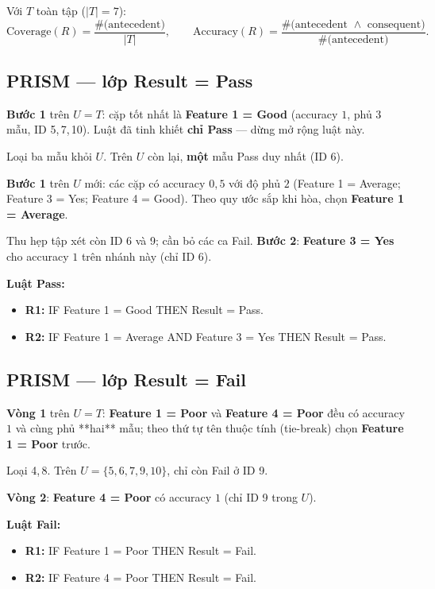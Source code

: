 Với \(T\) toàn tập (\(|T|=7\)):
\[
\text{Coverage}(R)=\frac{\#\text{(antecedent)}}{|T|},\qquad
\text{Accuracy}(R)=\frac{\#\text{(antecedent }\land\text{ consequent)}}{\#\text{(antecedent)}}.
\]

\subsection*{PRISM --- lớp Result = Pass}

\textbf{Bước 1} trên \(U=T\): cặp tốt nhất là \textbf{Feature 1 = Good} (accuracy \(1\), phủ \(3\) mẫu, ID 5,\,7,\,10). Luật đã tinh khiết \textbf{chỉ Pass} --- dừng mở rộng luật này.

Loại ba mẫu khỏi \(U\). Trên \(U\) còn lại, \textbf{một} mẫu Pass duy nhất (ID 6).

\textbf{Bước 1} trên \(U\) mới: các cặp có accuracy \(0{,}5\) với độ phủ \(2\) (Feature 1 = Average; Feature 3 = Yes; Feature 4 = Good). Theo quy ước sắp khi hòa, chọn \textbf{Feature 1 = Average}.

Thu hẹp tập xét còn ID 6 và 9; cần bỏ các ca Fail. \textbf{Bước 2}: \textbf{Feature 3 = Yes} cho accuracy \(1\) trên nhánh này (chỉ ID 6).

\medskip
\noindent\textbf{Luật Pass:}
\begin{itemize}\setlength\itemsep{0pt}
  \item \textbf{R1:} IF Feature 1 = Good THEN Result = Pass.
  \item \textbf{R2:} IF Feature 1 = Average AND Feature 3 = Yes THEN Result = Pass.
\end{itemize}

\subsection*{PRISM --- lớp Result = Fail}

\textbf{Vòng 1} trên \(U=T\): \textbf{Feature 1 = Poor} và \textbf{Feature 4 = Poor} đều có accuracy \(1\) và cùng phủ **hai** mẫu; theo thứ tự tên thuộc tính (tie-break) chọn \textbf{Feature 1 = Poor} trước.

Loại 4,\,8. Trên \(U=\{5,6,7,9,10\}\), chỉ còn Fail ở ID 9.

\textbf{Vòng 2}: \textbf{Feature 4 = Poor} có accuracy \(1\) (chỉ ID 9 trong \(U\)).

\medskip
\noindent\textbf{Luật Fail:}
\begin{itemize}\setlength\itemsep{0pt}
  \item \textbf{R1:} IF Feature 1 = Poor THEN Result = Fail.
  \item \textbf{R2:} IF Feature 4 = Poor THEN Result = Fail.
\end{itemize}

